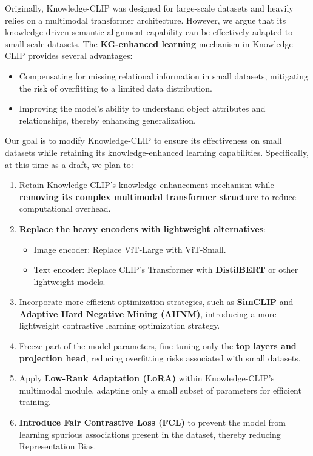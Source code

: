 \documentclass[11pt,letterpaper]{article}
\begin{document}
Originally, Knowledge-CLIP was designed for large-scale datasets and heavily relies on a multimodal transformer architecture. However, we argue that its knowledge-driven semantic alignment capability can be effectively adapted to small-scale datasets. The \textbf{KG-enhanced learning} mechanism in Knowledge-CLIP provides several advantages:
\begin{itemize}
    \item Compensating for missing relational information in small datasets, mitigating the risk of overfitting to a limited data distribution.
    \item Improving the model’s ability to understand object attributes and relationships, thereby enhancing generalization.
\end{itemize}
Our goal is to modify Knowledge-CLIP to ensure its effectiveness on small datasets while retaining its knowledge-enhanced learning capabilities. Specifically, at this time as a draft, we plan to:
\begin{enumerate}
    \item Retain Knowledge-CLIP’s knowledge enhancement mechanism while\textbf{ removing its complex multimodal transformer structure} to reduce computational overhead.
    \item \textbf{Replace the heavy encoders with lightweight alternatives}:
    \begin{itemize}
        \item Image encoder: Replace ViT-Large with ViT-Small.
        \item Text encoder: Replace CLIP’s Transformer with \textbf{DistilBERT} or other lightweight models.
    \end{itemize}
    \item Incorporate more efficient optimization strategies, such as \textbf{SimCLIP}\cite{liu2024an} and \textbf{Adaptive Hard Negative Mining (AHNM)}, introducing a more lightweight contrastive learning optimization strategy.
    \item Freeze part of the model parameters, fine-tuning only the \textbf{top layers and projection head}, reducing overfitting risks associated with small datasets.
    \item Apply\textbf{ Low-Rank Adaptation (LoRA)} within Knowledge-CLIP’s multimodal module, adapting only a small subset of parameters for efficient training.
    \item \textbf{Introduce Fair Contrastive Loss (FCL)\cite{alabdulmohsin2024clipbiasusefulbalancing}} to prevent the model from learning spurious associations present in the dataset, thereby reducing Representation Bias.
\end{enumerate}
\end{document}
